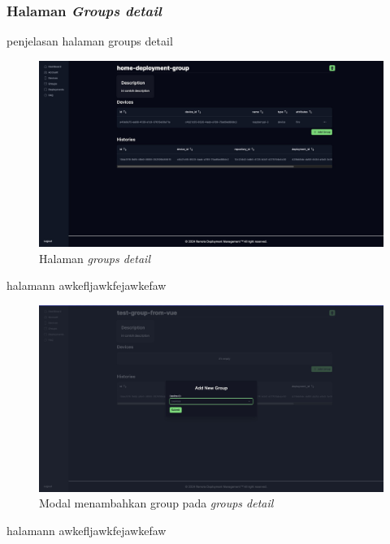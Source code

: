 \pagebreak

\subsubsection{Halaman \textit{Groups detail}}
penjelasan halaman groups detail
\begin{figure}[h]
  \centering
  \includegraphics[width=1\textwidth]{resources/chapter-4/dashboard/groups-detail-page.jpg}
  \caption{Halaman \textit{groups detail}}
  \label{fig:halaman-groups-detail}
\end{figure}

halamann awkefljawkfejawkefaw

\begin{figure}
  \centering
  \includegraphics[width=1\textwidth]{resources/chapter-4/dashboard/groups-detail-add-device.jpg}
  \caption{Modal menambahkan group pada \textit{groups detail}}
  \label{fig:halaman-groups-detail-add-group}
\end{figure}

halamann awkefljawkfejawkefaw

